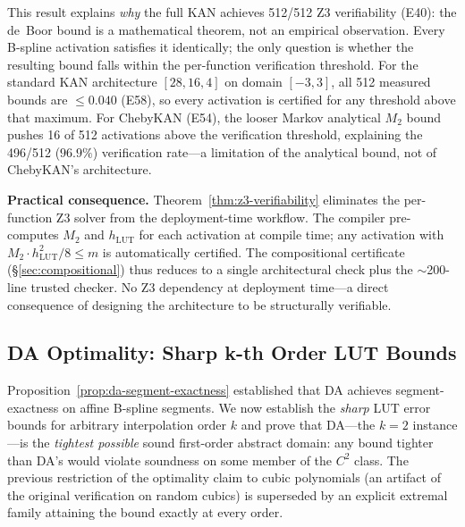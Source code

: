 This result explains \textit{why} the full KAN achieves 512/512 Z3
verifiability (E40): the de~Boor bound is a mathematical theorem,
not an empirical observation. Every B-spline activation satisfies
it identically; the only question is whether the resulting bound
falls within the per-function verification threshold. For the standard
KAN architecture
$[28,16,4]$ on domain $[-3,3]$, all 512 measured bounds are
$\leq 0.040$ (E58), so every activation is certified for any threshold
above that maximum. For ChebyKAN (E54), the looser Markov analytical
$M_2$ bound pushes 16 of 512 activations above the verification
threshold, explaining the 496/512 ($96.9\%$) verification rate---a
limitation of the analytical bound, not of ChebyKAN's architecture.

\vspace{4pt}
\noindent\textbf{Practical consequence.}
Theorem~\ref{thm:z3-verifiability} eliminates the per-function Z3 solver
from the deployment-time workflow. The compiler pre-computes $M_2$ and
$h_{\text{LUT}}$ for each activation at compile time; any activation
with $M_2 \cdot h_{\text{LUT}}^2 / 8 \leq m$ is automatically certified.
The compositional certificate ({\S}\ref{sec:compositional}) thus reduces
to a single architectural check plus the $\sim$200-line trusted checker.
No Z3 dependency at deployment time---a direct consequence of designing
the architecture to be structurally verifiable.

\subsection{DA Optimality: Sharp k-th Order LUT Bounds}
\label{sec:da-optimality}

Proposition~\ref{prop:da-segment-exactness} established that DA achieves
segment-exactness on affine B-spline segments. We now establish the
\textit{sharp} LUT error bounds for arbitrary interpolation order $k$ and
prove that DA---the $k=2$ instance---is the \textit{tightest possible}
sound first-order abstract domain: any bound tighter than DA's would
violate soundness on some member of the $C^2$ class. The previous
restriction of the optimality claim to cubic polynomials (an artifact of
the original verification on random cubics) is superseded by an explicit
extremal family attaining the bound exactly at every order.



